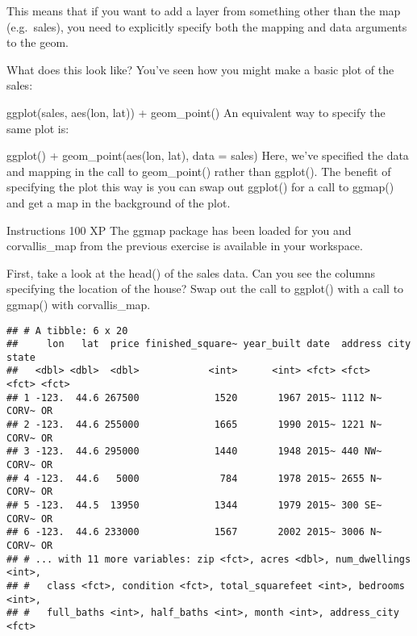 \documentclass[]{article}
\newenvironment{Shaded}{\begin{snugshade}}{\end{snugshade}}
\newcommand{\CommentTok}[1]{\textcolor[rgb]{0.56,0.35,0.01}{\textit{#1}}}
\newcommand{\KeywordTok}[1]{\textcolor[rgb]{0.13,0.29,0.53}{\textbf{#1}}}
\newcommand{\NormalTok}[1]{#1}
\newcommand{\OperatorTok}[1]{\textcolor[rgb]{0.81,0.36,0.00}{\textbf{#1}}}
\newcommand{\StringTok}[1]{\textcolor[rgb]{0.31,0.60,0.02}{#1}}
\begin{document}
This means that if you want to add a layer from something other than the
map (e.g.~sales), you need to explicitly specify both the mapping and
data arguments to the geom.

What does this look like? You've seen how you might make a basic plot of
the sales:

ggplot(sales, aes(lon, lat)) + geom\_point() An equivalent way to
specify the same plot is:

ggplot() + geom\_point(aes(lon, lat), data = sales) Here, we've
specified the data and mapping in the call to geom\_point() rather than
ggplot(). The benefit of specifying the plot this way is you can swap
out ggplot() for a call to ggmap() and get a map in the background of
the plot.

Instructions 100 XP The ggmap package has been loaded for you and
corvallis\_map from the previous exercise is available in your
workspace.

First, take a look at the head() of the sales data. Can you see the
columns specifying the location of the house? Swap out the call to
ggplot() with a call to ggmap() with corvallis\_map.

\begin{Shaded}
\end{Shaded}

\begin{verbatim}
## # A tibble: 6 x 20
##     lon   lat  price finished_square~ year_built date  address city  state
##   <dbl> <dbl>  <dbl>            <int>      <int> <fct> <fct>   <fct> <fct>
## 1 -123.  44.6 267500             1520       1967 2015~ 1112 N~ CORV~ OR   
## 2 -123.  44.6 255000             1665       1990 2015~ 1221 N~ CORV~ OR   
## 3 -123.  44.6 295000             1440       1948 2015~ 440 NW~ CORV~ OR   
## 4 -123.  44.6   5000              784       1978 2015~ 2655 N~ CORV~ OR   
## 5 -123.  44.5  13950             1344       1979 2015~ 300 SE~ CORV~ OR   
## 6 -123.  44.6 233000             1567       2002 2015~ 3006 N~ CORV~ OR   
## # ... with 11 more variables: zip <fct>, acres <dbl>, num_dwellings <int>,
## #   class <fct>, condition <fct>, total_squarefeet <int>, bedrooms <int>,
## #   full_baths <int>, half_baths <int>, month <int>, address_city <fct>
\end{verbatim}
\end{document}
